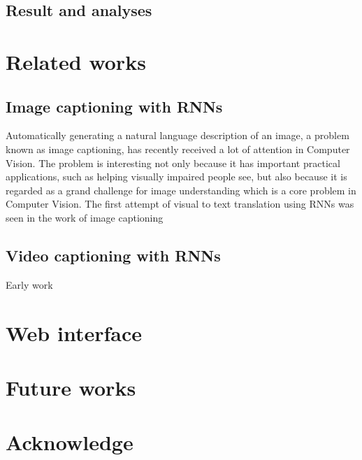 \subsection{Result and analyses}

\section{Related works}
\subsection{Image captioning with RNNs}
Automatically generating a natural language description of an image, a problem known as image captioning, has recently received a lot of attention in Computer Vision. The problem is interesting not only because it has important practical applications, such as helping visually impaired people see, but also because it is regarded as a grand challenge for image understanding which is a core problem in Computer Vision. The first attempt of visual to text translation using RNNs was seen in the work of image captioning \cite{Mao2014Deep}

\subsection{Video captioning with RNNs}
Early work 

\section{Web interface}

\section{Future works}
\section{Acknowledge}





